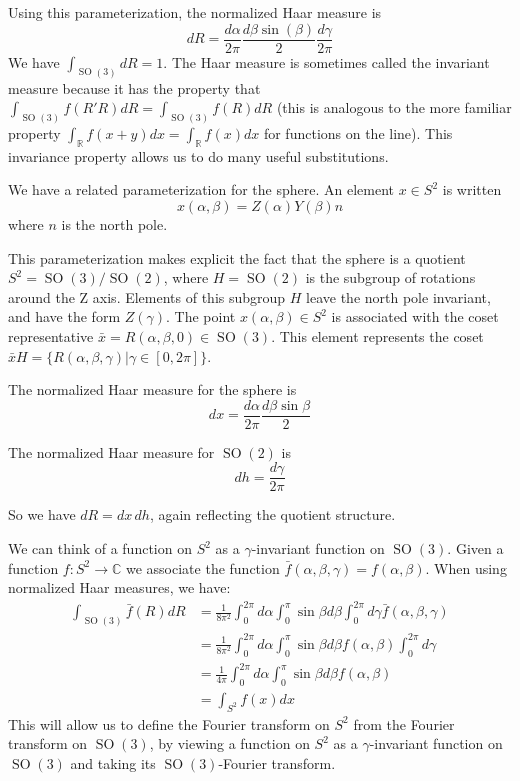 \documentclass{article} %
\newcommand{\R}{\mathbb{R}}
\newcommand{\C}{\mathbb{C}}
\newcommand{\SO}[1]{\ensuremath{\operatorname{SO}(#1)}}
\begin{document}
Using this parameterization, the normalized Haar measure is
\begin{equation}
  dR = \frac{d\alpha}{2\pi} \frac{d\beta \sin(\beta)}{2} \frac{d\gamma}{2 \pi}
\end{equation}
We have $\int_{\SO3} dR = 1$.
The Haar measure \citep{Nachbin1965,Chirikjian2001} is sometimes called the invariant measure because it has the property that $\int_{\SO3} f(R'R) dR = \int_{\SO3} f(R) dR$ (this is analogous to the more familiar property $\int_{\R} f(x + y) dx = \int_\R f(x) dx$ for functions on the line).
This invariance property allows us to do many useful substitutions.


We have a related parameterization for the sphere.
An element $x \in S^2$ is written
\begin{equation}
  x(\alpha, \beta) = Z(\alpha)Y(\beta)n
\end{equation}
where $n$ is the north pole.

This parameterization makes explicit the fact that the sphere is a quotient $S^2 = \SO3 / \SO2$, where $H = \SO2$ is the subgroup of rotations around the Z axis.
Elements of this subgroup $H$ leave the north pole invariant, and have the form $Z(\gamma)$.
The point $x(\alpha, \beta) \in S^2$ is associated with the coset representative $\bar{x} = R(\alpha, \beta, 0) \in \SO3$.
This element represents the coset $\bar{x}H = \{R(\alpha, \beta, \gamma) | \gamma \in [0, 2\pi] \}$.

The normalized Haar measure for the sphere is
\begin{equation}
  dx = \frac{d\alpha}{2\pi} \frac{d\beta \sin \beta}{2}
\end{equation}

The normalized Haar measure for $\SO2$ is
\begin{equation}
  dh = \frac{d\gamma}{2 \pi}
\end{equation}

So we have $dR = dx \, dh$, again reflecting the quotient structure.

We can think of a function on $S^2$ as a $\gamma$-invariant function on $\SO3$.
Given a function $f : S^2 \rightarrow \C$ we associate the function $\bar{f}(\alpha, \beta, \gamma) = f(\alpha, \beta)$.
When using normalized Haar measures, we have:
\begin{equation}
  \begin{aligned}
    \int_{\SO3} \bar{f}(R) dR
    &=
    \frac{1}{8 \pi^2}\int_0^{2\pi} d\alpha \int_0^\pi \sin\beta d\beta \int_0^{2\pi} d\gamma \bar{f}(\alpha, \beta, \gamma) \\
    &=
    \frac{1}{8 \pi^2}\int_0^{2\pi} d\alpha \int_0^\pi \sin\beta d\beta f(\alpha, \beta) \int_0^{2\pi} d\gamma \\
    &=
    \frac{1}{4 \pi}\int_0^{2\pi} d\alpha \int_0^\pi \sin\beta d\beta f(\alpha, \beta) \\
    &=
    \int_{S^2} f(x) dx
  \end{aligned}
\end{equation}
This will allow us to define the Fourier transform on $S^2$ from the Fourier transform on $\SO3$, by viewing a function on $S^2$ as a $\gamma$-invariant function on $\SO3$ and taking its $\SO3$-Fourier transform.
\end{document}
